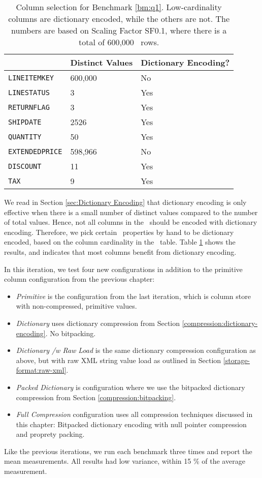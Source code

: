 \begin{table}
    \begin{tabularx}{\textwidth}{X | X X}
        & Distinct Values & Dictionary Encoding? \\ 
        \hline
        \hline
        \texttt{LINEITEMKEY} & 600,000 & No \\
        \texttt{LINESTATUS} & 3 & Yes \\
        \texttt{RETURNFLAG} & 3 & Yes \\
        \texttt{SHIPDATE} & 2526 & Yes \\
        \texttt{QUANTITY} & 50 & Yes \\
        \texttt{EXTENDEDPRICE} & 598,966 & No \\
        \texttt{DISCOUNT} & 11 & Yes \\
        \texttt{TAX} & 9 & Yes
    \end{tabularx}
    \caption{Column selection for Benchmark \ref{bm:q1}. Low-cardinality columns are dictionary encoded, while the others are not. The numbers are based on Scaling Factor SF0.1, where there is a total of 600,000 \lineitem~rows.}
    \label{tab:column-selection}
\end{table}

We read in Section \ref{sec:Dictionary Encoding} that dictionary encoding is only effective when there is a small number of distinct values compared to the number of total values. Hence, not all columns in the \tpchdl~should be encoded with dictionary encoding. Therefore, we pick certain \lineitem~properties by hand to be dictionary encoded, based on the column cardinality in the \lineitem~table. Table \ref{tab:column-selection} shows the results, and indicates that most columns benefit from dictionary encoding.

In this iteration, we test four new configurations in addition to the primitive column configuration from the previous chapter:
\begin{itemize}
    \item \textit{Primitive} is the configuration from the last iteration, which is column store with non-compressed, primitive values.
    \item \textit{Dictionary} uses dictionary compression from Section \ref{compression:dictionary-encoding}. No bitpacking.
    \item \textit{Dictionary /w Raw Load} is the same dictionary compression configuration as above, but with raw XML string value load as outlined in Section \ref{storage-format:raw-xml}.
    \item \textit{Packed Dictionary} is configuration where we use the bitpacked dictionary compression from Section \ref{compression:bitpacking}.
    \item \textit{Full Compression} configuration uses all compression techniques discussed in this chapter: Bitpacked dictionary encoding with null pointer compression and proprety packing.
\end{itemize}
Like the previous iterations, we run each benchmark three times and report the mean measurements. All results had low variance, within 15 \% of the average measurement.

